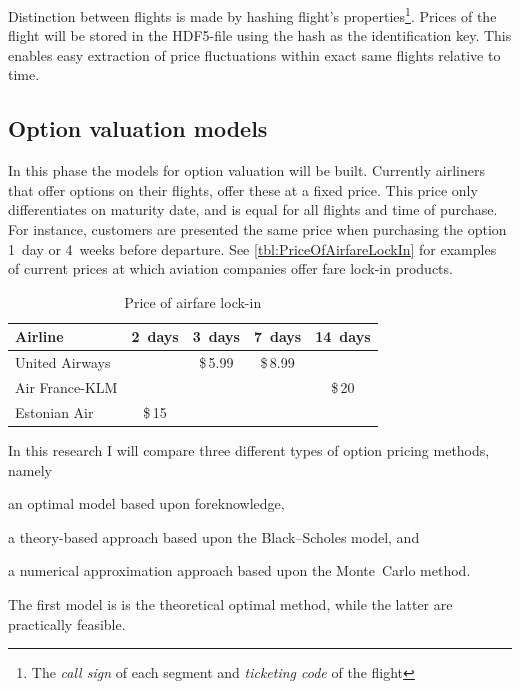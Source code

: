 Distinction between flights is made by hashing flight's  properties\footnote{The \emph{call sign} of each segment and \emph{ticketing code} of the flight}. Prices of the flight will be stored in the HDF5-file using the hash as the identification key. This enables easy extraction of price fluctuations within exact same flights relative to time.

\subsection{Option valuation models}
\label{subsec:OptionValuationModels}


In this phase the models for option valuation will be built. Currently airliners that offer options on their flights, offer these at a fixed price. This price only differentiates on maturity date, and is equal for all flights and time of purchase. For instance, customers are presented the same price when purchasing the option 1~day or 4~weeks before departure. See \autoref{tbl:PriceOfAirfareLockIn} for examples of current prices at which aviation companies offer fare lock-in products.

\begin{table}[ht]
	\centering
	\begin{tabular}{l  c  c  c  c}
	\hline \hline
	Airline         & 2~days & 3~days  & 7~days  & 14~days \\ \hline
	United Airways  &        & \$\,5.99 & \$\,8.99 & 	       \\
	Air France-KLM  &        &         &         & \$\,20   \\
	Estonian Air    & \$\,15   &         &         &         \\
	\hline
	\end{tabular}
	\caption{Price of airfare lock-in}
	\label{tbl:PriceOfAirfareLockIn}
\end{table}

In this research I will compare three different types of option pricing methods, name\-ly \begin{inparaenum}
\item an optimal model based upon foreknowledge,
\item a theory-based approach based upon the Black--Scholes model, and
\item a numerical approximation approach based upon the Monte~Carlo method.
\end{inparaenum} The first model is is the theoretical optimal method, while the latter are practically feasible.

